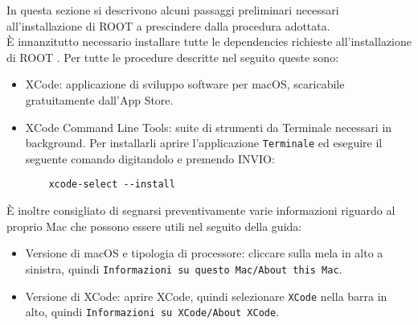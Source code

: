 In questa sezione si descrivono alcuni passaggi preliminari necessari all'installazione di ROOT a prescindere dalla procedura adottata.\\
È innanzitutto necessario installare tutte le dependencies richieste all'installazione di ROOT \cite{root_required_dependecies}. Per tutte le procedure descritte nel seguito queste sono:
\begin{itemize}
    \item XCode: applicazione di sviluppo software per macOS, scaricabile gratuitamente dall'App Store.
    \item XCode Command Line Tools: suite di strumenti da Terminale necessari in background. Per installarli aprire l'applicazione \texttt{Terminale} ed eseguire il seguente comando digitandolo e premendo INVIO:
    \begin{verbatim}
    xcode-select --install
    \end{verbatim}
\end{itemize}
È inoltre consigliato di segnarsi preventivamente varie informazioni riguardo al proprio Mac che possono essere utili nel seguito della guida:
\begin{itemize}
    \item Versione di macOS e tipologia di processore: cliccare sulla mela in alto a sinistra, quindi \texttt{Informazioni su questo Mac/About this Mac}.
    \item Versione di XCode: aprire XCode, quindi selezionare \texttt{XCode} nella barra in alto, quindi \texttt{Informazioni su XCode/About XCode}.
\end{itemize}


